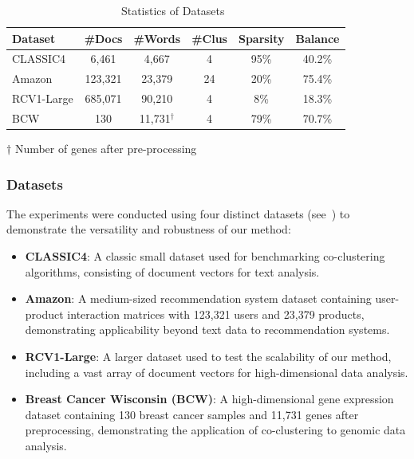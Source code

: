 \documentclass[journal]{IEEEtran}
\theoremstyle{definition}
\theoremstyle{remark} %
\renewcommand{\cite}[1]{~\autocite{#1}}
\begin{document}
\begin{table}[ht]
    \centering
    \caption{Statistics of Datasets\cite{role2019CoClustPythonPackage}}
    \label{tab:dataset-statistics}
    \begin{threeparttable}
        \begin{tabular}{l||c|c|c|c|c}
            \hline
            \textbf{Dataset} & \textbf{\#Docs} & \textbf{\#Words}   & \textbf{\#Clus} & \textbf{Sparsity} & \textbf{Balance} \\
            \hline
            CLASSIC4         & 6,461           & 4,667              & 4               & 95\%              & 40.2\%           \\
            Amazon           & 123,321         & 23,379             & 24              & 20\%              & 75.4\%           \\
            RCV1-Large       & 685,071         & 90,210             & 4               & 8\%               & 18.3\%           \\
            BCW              & 130             & 11,731$^{\dagger}$ & 4               & 79\%              & 70.7\%           \\
            \hline
        \end{tabular}
        \begin{tablenotes}
            \small
            \item[$\dagger$] Number of genes after pre-processing
        \end{tablenotes}
    \end{threeparttable}
\end{table}

\subsubsection{Datasets}
\label{subsec:datasets}
The experiments were conducted using four distinct datasets (see~) to demonstrate the versatility and robustness of our method:
\begin{itemize}
    \item \textbf{CLASSIC4}: A classic small dataset used for benchmarking co-clustering algorithms, consisting of document vectors for text analysis.
    \item \textbf{Amazon}: {\color{blue}A medium-sized recommendation system dataset containing user-product interaction matrices with 123,321 users and 23,379 products, demonstrating applicability beyond text data to recommendation systems.}
    \item \textbf{RCV1-Large}: A larger dataset used to test the scalability of our method, including a vast array of document vectors for high-dimensional data analysis.
    \item \textbf{Breast Cancer Wisconsin (BCW)}: {\color{blue}A high-dimensional gene expression dataset containing 130 breast cancer samples and 11,731 genes after preprocessing, demonstrating the application of co-clustering to genomic data analysis.}
\end{itemize}
\end{document}
